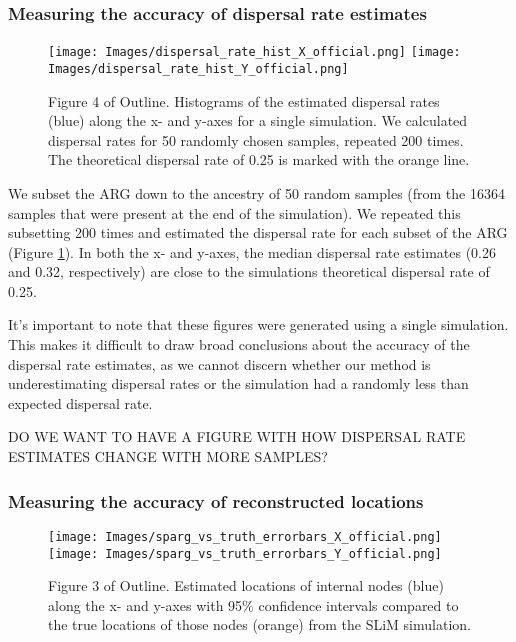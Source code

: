 \subsubsection{Measuring the accuracy of dispersal rate estimates}

\begin{figure}[H]
    \centering
    \texttt{[image: Images/dispersal\_rate\_hist\_X\_official.png]}
    \texttt{[image: Images/dispersal\_rate\_hist\_Y\_official.png]}
    \caption{ Figure 4 of Outline. Histograms of the estimated dispersal rates (blue) along the x- and y-axes for a single simulation. We calculated dispersal rates for 50 randomly chosen samples, repeated 200 times. The theoretical dispersal rate of 0.25 is marked with the orange line.}
    \label{fig:dispersal_rates_hist}
\end{figure}

We subset the ARG down to the ancestry of 50 random samples (from the 16364 samples that were present at the end of the simulation). We repeated this subsetting 200 times and estimated the dispersal rate for each subset of the ARG (Figure \ref{fig:dispersal_rates_hist}). In both the x- and y-axes, the median dispersal rate estimates (0.26 and 0.32, respectively) are close to the simulations theoretical dispersal rate of 0.25.

It's important to note that these figures were generated using a single simulation. This makes it difficult to draw broad conclusions about the accuracy of the dispersal rate estimates, as we cannot discern whether our method is underestimating dispersal rates or the simulation had a randomly less than expected dispersal rate.

DO WE WANT TO HAVE A FIGURE WITH HOW DISPERSAL RATE ESTIMATES CHANGE WITH MORE SAMPLES?

\subsubsection{Measuring the accuracy of reconstructed locations}

\begin{figure}[H]
    \centering
    \texttt{[image: Images/sparg\_vs\_truth\_errorbars\_X\_official.png]}
    \texttt{[image: Images/sparg\_vs\_truth\_errorbars\_Y\_official.png]}
    \caption{ Figure 3 of Outline. Estimated locations of internal nodes (blue) along the x- and y-axes with 95\% confidence intervals compared to the true locations of those nodes (orange) from the SLiM simulation. }
    \label{fig:ancestral_locations_plots}
\end{figure}

